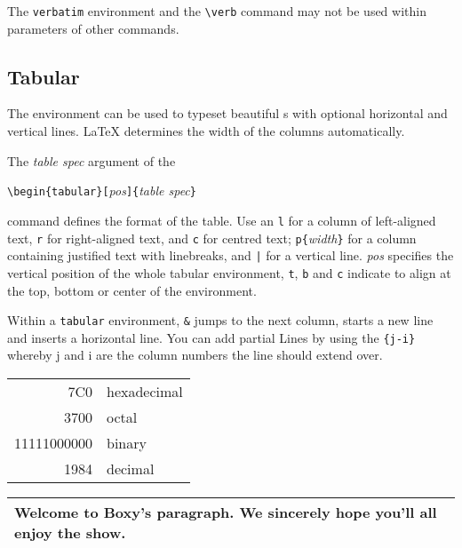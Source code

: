 The \texttt{verbatim} environment and the \verb|\verb| command may not be used
within parameters of other commands.


\subsection{Tabular}

The  environment can be used to typeset beautiful
s with optional horizontal and vertical lines. \LaTeX{}
determines the width of the columns automatically.

The \emph{table spec} argument of the 
\begin{lscommand}
\verb|\begin{tabular}[|\emph{pos}\verb|]{|\emph{table spec}\verb|}|
\end{lscommand} 
\noindent command defines the format of the table. Use an \texttt{l} for a column of
left-aligned text, \texttt{r} for right-aligned text, and \texttt{c} for
centred text; \verb|p{|\emph{width}\verb|}| for a column containing justified
text with linebreaks, and \verb.|. for a vertical line.
\emph{pos} specifies the vertical position of the whole tabular environment,
\texttt{t}, \texttt{b} and \texttt{c} indicate to align at the
top, bottom or center of the environment.
 
Within a \texttt{tabular} environment, \verb|&| jumps to the next column,
\ci{\bs} starts a new line and  inserts a horizontal line.
You can add partial Lines by using the \verb|{j-i}| whereby
j and i are the column numbers the line should extend over.


\begin{example}
\begin{tabular}{|r|l|}
\hline
7C0 & hexadecimal \\
3700 & octal \\ \cline{2-2}
11111000000 & binary \\
\hline \hline
1984 & decimal \\
\hline
\end{tabular}
\end{example}

\begin{example}
\begin{tabular}{|p{4.7cm}|}
\hline
Welcome to Boxy's paragraph.
We sincerely hope you'll 
all enjoy the show.\\
\hline 
\end{tabular}
\end{example}


